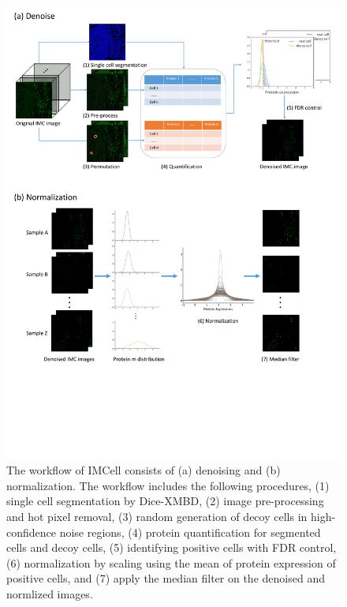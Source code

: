 \documentclass{mynature}
\begin{document}
\begin{figure}[!htb]
  \centering
  \includegraphics[width=\linewidth]{Figure/Figure1.pdf}
  \caption{The workflow of IMCell consists of (a) denoising and (b) normalization. The workflow includes the following procedures, (1) single cell segmentation by Dice-XMBD, (2) image pre-processing and hot pixel removal, (3) random generation of decoy cells in high-confidence noise regions, (4) protein quantification for segmented cells and decoy cells, (5) identifying positive cells with FDR control, (6) normalization by scaling using the mean of protein expression of positive cells, and (7) apply the median filter on the denoised and normlized images. 
  }
  \label{fig1:workflow}
\end{figure}
\end{document}

